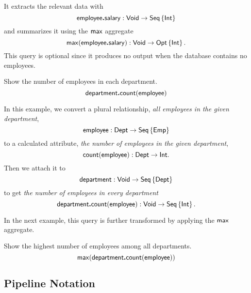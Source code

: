 It extracts the relevant data with
\begin{equation*}
    \Employee\To\Salary : \Void \to \Seq{\Int}
\end{equation*}
and summarizes it using the $\Max$ aggregate
\begin{equation*}
    \Max(\Employee\To\Salary) : \Void \to \Opt{\Int}.
\end{equation*}
This query is optional since it produces no output when the database contains
no employees.

\begin{example}
    \label{ex:department-count-employee}
    Show the number of employees in each department.
    \begin{equation*}
        \Department\To\Count(\Employee)
    \end{equation*}
\end{example}

In this example, we convert a plural relationship, \emph{all employees in the
given department},
\begin{equation*}
    \Employee : \Dept \to \Seq{\Emp}
\end{equation*}
to a calculated attribute, \emph{the number of employees in the given
department},
\begin{equation*}
    \Count(\Employee) : \Dept \to \Int.
\end{equation*}
Then we attach it to
\begin{equation*}
    \Department : \Void \to \Seq{\Dept}
\end{equation*}
to get \emph{the number of employees in every department}
\begin{equation*}
    \Department\To\Count(\Employee) : \Void \to \Seq{\Int}.
\end{equation*}

In the next example, this query is further transformed by applying the $\Max$
aggregate.

\begin{example}
    \label{ex:max-department-count-employee}
    Show the highest number of employees among all departments.
    \begin{equation*}
        \Max(\Department\To\Count(\Employee))
    \end{equation*}
\end{example}

\subsection*{Pipeline Notation}

